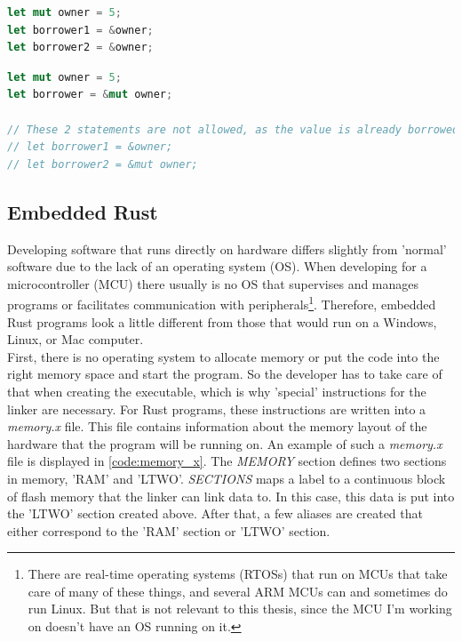 \begin{minipage}{\textwidth}
\begin{lstlisting}[style=colorEX,language=Rust,caption={Simple example of an immutable borrow},label={code:borrow}]
let mut owner = 5;
let borrower1 = &owner;
let borrower2 = &owner;
\end{lstlisting}
\end{minipage}

\begin{minipage}{\textwidth}
\begin{lstlisting}[style=colorEX,language=Rust,caption={Simple example of a mutable borrow},label={code:mut_borrow}]
let mut owner = 5;
let borrower = &mut owner;

// These 2 statements are not allowed, as the value is already borrowed as mutable.
// let borrower1 = &owner;
// let borrower2 = &mut owner;
\end{lstlisting}
\end{minipage}

\subsection{Embedded Rust}

Developing software that runs directly on hardware differs slightly from 'normal' software due to the lack of an operating system (OS).
When developing for a microcontroller (MCU) there usually is no OS that supervises and manages programs or facilitates communication with peripherals\footnote
{There are real-time operating systems (RTOSs) that run on MCUs that take care of many of these things,
and several ARM MCUs can and sometimes do run Linux. But that is not relevant to this thesis, since the MCU I'm working on doesn't have an OS running on it.}.
Therefore, embedded Rust programs look a little different from those that would run on a Windows, Linux, or Mac computer.
\\
First, there is no operating system to allocate memory or put the code into the right memory space and start the program.
So the developer has to take care of that when creating the executable, which is why 'special' instructions for the linker are necessary.
For Rust programs, these instructions are written into a \emph{memory.x} file.
This file contains information about the memory layout of the hardware that the program will be running on.
An example of such a \emph{memory.x} file is displayed in \ref{code:memory_x}.
The \emph{MEMORY} section defines two sections in memory, 'RAM' and 'LTWO'.
\emph{SECTIONS} maps a label to a continuous block of flash memory that the linker can link data to.
In this case, this data is put into the 'LTWO' section created above.
After that, a few aliases are created that either correspond to the 'RAM' section or 'LTWO' section.

